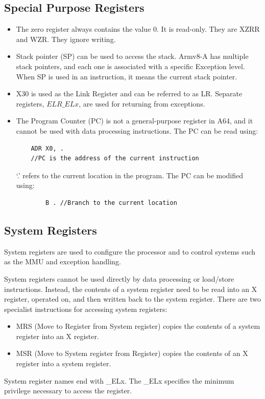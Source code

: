 \documentclass[letterpaper,12pt]{article}
\begin{document}
\subsection{Special Purpose Registers}
\begin{itemize}
    \item The zero register always contains the value 0. It is read-only. They are XZRR and WZR. They ignore writing.
    \item Stack pointer (SP) can be used to access the stack.  Armv8-A has multiple stack pointers, and each one is associated with a specific Exception level. When SP is used in an instruction, it means the current stack pointer. 
    \item X30 is used as the Link Register and can be referred to as LR. Separate registers, $ELR\_ELx$, are used for returning from exceptions.
    \item The Program Counter (PC) is not a general-purpose register in A64, and it cannot be used with data processing instructions. The PC can be read using: 
    
    \begin{lstlisting}
    ADR X0, . 
    //PC is the address of the current instruction
    \end{lstlisting}
    
    `.' refers to the current location in the program. The PC can be modified using: \begin{lstlisting}
        B . //Branch to the current location
    \end{lstlisting}
\end{itemize}

\subsection{System Registers}
System registers are used to configure the processor and to control systems such as the MMU and exception handling.

System registers cannot be used directly by data processing or load/store instructions. Instead, the contents of a system register need to be read into an X register, operated on, and then written back to the system register. There are two specialist instructions for accessing system registers:

\begin{itemize}
    \item MRS (Move to Register from System register) copies the contents of a system register into an X register.
    \item MSR (Move to System register from Register) copies the contents of an X register into a system register.
\end{itemize}

System register names end with \_ELx. The \_ELx specifies the minimum privilege necessary to access the register.
\end{document}
